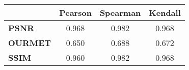 \begin{tabular}{|l|c|c|c|}
\hline
&\textbf{Pearson}&\textbf{Spearman}&\textbf{Kendall}\\\hline
\textbf{PSNR}&0.968&0.982&0.968\\\hline
\textbf{OURMET}&0.650&0.688&0.672\\\hline
\textbf{SSIM}&0.960&0.982&0.968\\\hline
\end{tabular}
